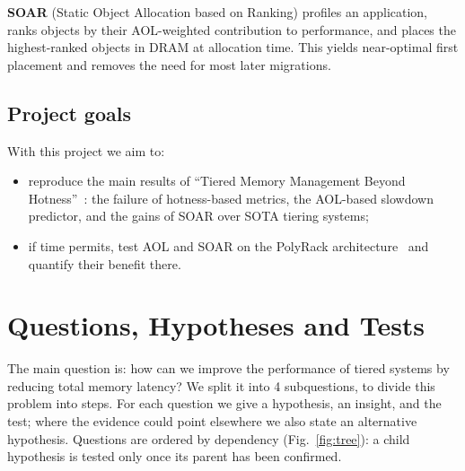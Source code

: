 \documentclass[conference]{IEEEtran}
\begin{document}
\textbf{SOAR} (Static Object Allocation based on Ranking) profiles an
application, ranks objects by their AOL-weighted contribution to performance,
and places the highest-ranked objects in DRAM at allocation time. This yields
near-optimal first placement and removes the need for most later migrations.

\subsection{Project goals}
With this project we aim to:
\begin{itemize}
  \item reproduce the main results of ``Tiered Memory Management Beyond
        Hotness''~\cite{liu2025tiered}: the failure of hotness-based metrics,
        the AOL-based slowdown predictor, and the gains of SOAR over SOTA
        tiering systems;
  \item if time permits, test AOL and SOAR on the PolyRack
        architecture~\cite{polyrack} and quantify their benefit there.
\end{itemize}

\section{Questions, Hypotheses and Tests}
\label{sec:questions}

The main question is: how can we improve the performance of tiered systems by reducing total memory latency?
We split it into 4 subquestions, to divide this problem into steps.
For each question we give a hypothesis, an insight, and the test; where
the evidence could point elsewhere we also state an alternative hypothesis.
Questions are ordered by dependency (Fig.~\ref{fig:tree}): a child
hypothesis is tested only once its parent has been confirmed.
\end{document}
